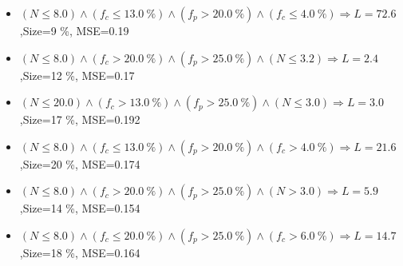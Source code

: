 \documentclass[numbered]{CSL}
\begin{document}
\begin{itemize}
\item $(N \leq 8.0) \land (f_c \leq 13.0~\%) \land (f_p > 20.0~\%) \land (f_c \leq 4.0~\%) \Rightarrow L = 72.6$,\hfill Size=9 \%, MSE=0.19
\item $(N \leq 8.0) \land (f_c > 20.0~\%) \land (f_p > 25.0~\%) \land (N \leq 3.2) \Rightarrow L = 2.4$,\hfill Size=12 \%, MSE=0.17
\item $(N \leq 20.0) \land (f_c > 13.0~\%) \land (f_p > 25.0~\%) \land (N \leq 3.0) \Rightarrow L = 3.0$,\hfill Size=17 \%, MSE=0.192
\item $(N \leq 8.0) \land (f_c \leq 13.0~\%) \land (f_p > 20.0~\%) \land (f_c > 4.0~\%) \Rightarrow L = 21.6$,\hfill Size=20 \%, MSE=0.174
\item $(N \leq 8.0) \land (f_c > 20.0~\%) \land (f_p > 25.0~\%) \land (N > 3.0) \Rightarrow L = 5.9$,\hfill Size=14 \%, MSE=0.154
\item $(N \leq 8.0) \land (f_c \leq 20.0~\%) \land (f_p > 25.0~\%) \land (f_c > 6.0~\%) \Rightarrow L = 14.7$,\hfill Size=18 \%, MSE=0.164
\end{itemize}
\end{document}
